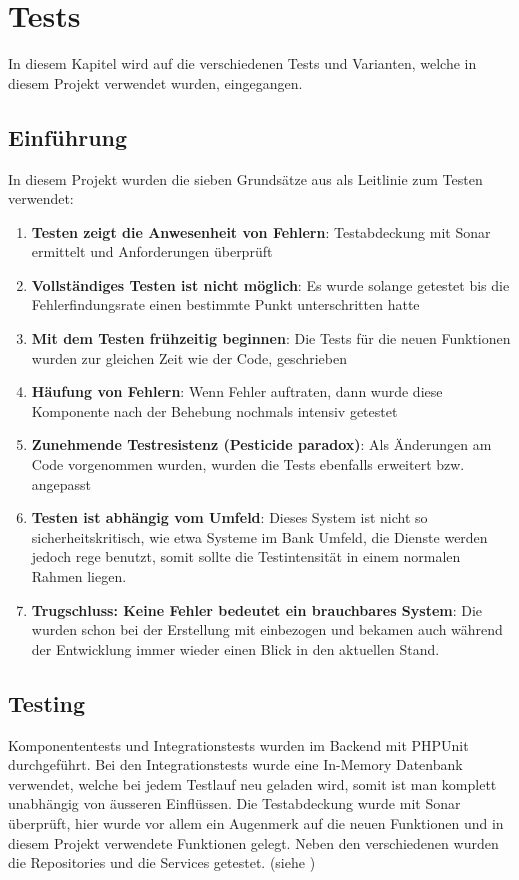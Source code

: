 %
%

\chapter{Tests}\label{chap.tests} 
In diesem Kapitel wird auf die verschiedenen Tests und Varianten, welche in diesem Projekt verwendet wurden, eingegangen.

\section{Einführung}
In diesem Projekt wurden die sieben Grundsätze aus \cite{test_soft_book} als Leitlinie zum Testen verwendet:
\begin{enumerate}
\item \textbf{Testen zeigt die Anwesenheit von Fehlern}: Testabdeckung mit Sonar ermittelt und Anforderungen überprüft
\item \textbf{Vollständiges Testen ist nicht möglich}: Es wurde solange getestet bis die Fehlerfindungsrate einen bestimmte Punkt unterschritten hatte
\item \textbf{Mit dem Testen frühzeitig beginnen}: Die Tests für die neuen Funktionen wurden zur gleichen Zeit wie der Code, geschrieben
\item \textbf{Häufung von Fehlern}: Wenn Fehler auftraten, dann wurde diese Komponente nach der Behebung nochmals intensiv getestet
\item \textbf{Zunehmende Testresistenz (Pesticide paradox)}: Als Änderungen am Code vorgenommen wurden, wurden die Tests ebenfalls erweitert bzw. angepasst
\item \textbf{Testen ist abhängig vom Umfeld}: Dieses System ist nicht so sicherheitskritisch, wie etwa Systeme im Bank Umfeld, die Dienste werden jedoch rege benutzt, somit sollte die Testintensität in einem normalen Rahmen liegen.
\item \textbf{Trugschluss: Keine Fehler bedeutet ein brauchbares System}: Die  wurden schon bei der  Erstellung mit einbezogen und bekamen auch während der Entwicklung immer wieder einen Blick in den aktuellen Stand.
\end{enumerate}

\section{Testing}
Komponententests und Integrationstests wurden im Backend mit PHPUnit durchgeführt. Bei den Integrationstests wurde eine In-Memory Datenbank verwendet, welche bei jedem Testlauf neu geladen wird, somit ist man komplett unabhängig von äusseren Einflüssen. Die Testabdeckung wurde mit Sonar überprüft, hier wurde vor allem ein Augenmerk auf die neuen Funktionen und in diesem Projekt verwendete Funktionen gelegt. Neben den verschiedenen  wurden die Repositories und die Services getestet. (siehe \cite{test_soft_book})

